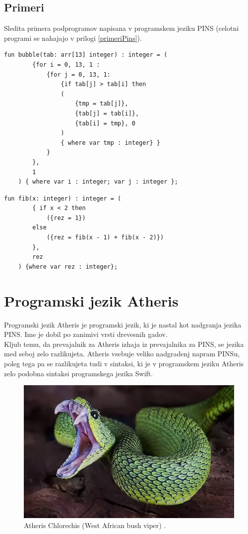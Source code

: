 \documentclass[a4paper, 12p]{book}
\begin{document}
\section{Primeri}

Sledita primera podprogramov napisana v programskem jeziku PINS (celotni programi se nahajajo v prilogi \ref{primeriPins}).

\begin{lstlisting}[caption={Sortiranje z navadnimi zamenjavami.}, captionpos=b]
	fun bubble(tab: arr[13] integer) : integer = (
	    {for i = 0, 13, 1 :
	        {for j = 0, 13, 1:
	            {if tab[j] > tab[i] then 
	            (
	                {tmp = tab[j]},
	                {tab[j] = tab[i]},
	                {tab[i] = tmp}, 0
	            ) 
	            { where var tmp : integer} }
	    	}
		},
		1
	) { where var i : integer; var j : integer };
\end{lstlisting}

\begin{lstlisting}[caption={Izračun n-tega fibonaccijevega števila.}, captionpos=b]
	fun fib(x: integer) : integer = (
	    { if x < 2 then
	        ({rez = 1})
	    else 
	        ({rez = fib(x - 1) + fib(x - 2)})
	    },
	    rez
	) {where var rez : integer};
\end{lstlisting}

\chapter{Programski jezik Atheris}
\label{ch1}

Programski jezik Atheris je programski jezik, ki je nastal kot nadgranja jezika PINS. Ime je dobil po zanimivi vrsti drevesnih gadov. \\
\indent Kljub temu, da prevajalnik za Atheris izhaja iz prevajalnika za PINS, se jezika med seboj zelo razlikujeta. Atheris vsebuje veliko nadgradenj napram PINSu, poleg tega pa se razlikujeta tudi v sintaksi, ki je v programskem jeziku Atheris zelo podobna sintaksi programskega jezika Swift. 
\begin{figure}[h]
	\begin{center}
		\includegraphics[width=1\textwidth]{resources/atheris.png}
	\end{center}
	\caption{Atheris Chlorechis (West African bush viper) \cite{Atheris}.}
	\label{image:ast}
\end{figure}
\end{document}
